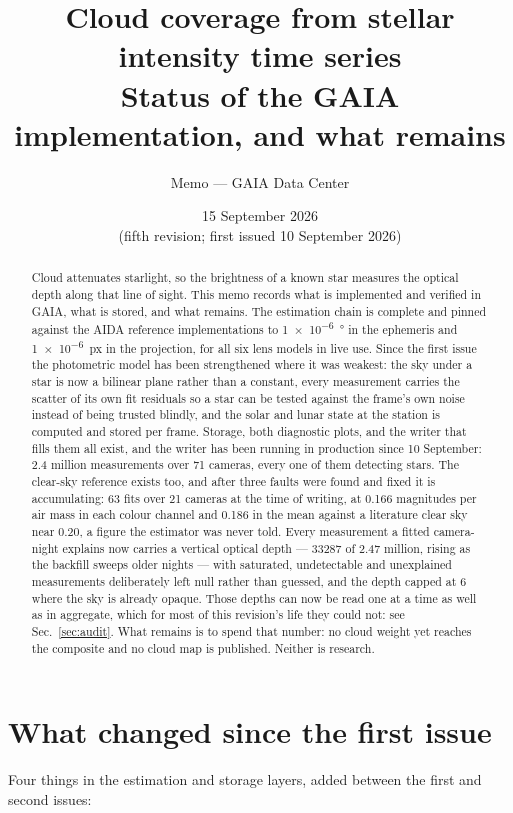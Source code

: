 \documentclass[11pt,a4paper]{article}
\title{\bfseries Cloud coverage from stellar intensity time series\\[2mm]
\large Status of the GAIA implementation, and what remains}
\author{Memo --- GAIA Data Center}
\date{15 September 2026 \\ \small(fifth revision; first issued 10 September 2026)}
\begin{document}
\maketitle

\begin{abstract}
\noindent
Cloud attenuates starlight, so the brightness of a known star measures the
optical depth along that line of sight. This memo records what is implemented
and verified in GAIA, what is stored, and what remains. The estimation chain is
complete and pinned against the AIDA reference implementations to
\SI{1e-6}{\degree} in the ephemeris and \SI{1e-6}{px} in the projection, for all
six lens models in live use. Since the first issue the photometric model has
been strengthened where it was weakest: the sky under a star is now a bilinear
plane rather than a constant, every measurement carries the scatter of its own
fit residuals so a star can be tested against the frame's own noise instead of
being trusted blindly, and the solar and lunar state at the station is computed
and stored per frame. Storage, both diagnostic plots, and the writer that
fills them all exist, and the writer has been running in production since
10 September: \num{2.4} million measurements over \num{71} cameras, every one
of them detecting stars. The clear-sky reference exists too, and after three
faults were found and fixed it is accumulating: 63 fits over 21 cameras at the
time of writing, at \num{0.166} magnitudes per air mass in each colour channel
and \num{0.186} in the mean against a literature
clear sky near \num{0.20}, a figure the estimator was never told. Every measurement a fitted
camera-night explains now carries a vertical optical depth --- \num{33287} of
\num{2.47} million, rising as the backfill sweeps older nights --- with
saturated, undetectable and unexplained measurements deliberately left null
rather than guessed, and the depth capped at 6 where the sky is already opaque.
Those depths can now be read one at a time as well as in aggregate, which for
most of this revision's life they could not: see Sec.~\ref{sec:audit}. What
remains is to spend that number: no cloud weight yet reaches the
composite and no cloud map is published. Neither is research.
\end{abstract}

\section{What changed since the first issue}

Four things in the estimation and storage layers, added between the first and
second issues:
\end{document}
